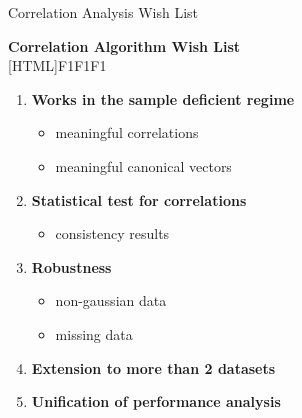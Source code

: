 \documentclass[8pt]{beamer}
\begin{document}
\begin{frame}{Correlation Analysis Wish List}
  \addtocounter{framenumber}{-1}

  \begin{center}
    \textbf{Correlation Algorithm Wish List}\\[1ex]
[HTML]{F1F1F1}{\parbox{0.8\textwidth}{%
    \begin{enumerate}
    \item \textcolor{texthigh}{\textbf{Works in the sample deficient regime} \checkmark}
      \begin{itemize}
      \item {\textcolor{texthigh}{meaningful correlations \checkmark}}
      \item \textcolor{texthigh}{meaningful canonical vectors \checkmark}
      \end{itemize}
    \item {\textcolor{texthigh}{\textbf{Statistical test for correlations} \checkmark}}
      \begin{itemize}
      \item {\textcolor{texthigh}{consistency results \checkmark}}
      \end{itemize}
    \item {\textcolor{texthigh}{\textbf{Robustness} \checkmark}}
      \begin{itemize}
      \item {\textcolor{texthigh}{non-gaussian data \checkmark}}
      \item {\textcolor{texthigh}{missing data \checkmark}}
      \end{itemize}
    \item \textcolor{texthigh}{\textbf{Extension to more than 2 datasets} \checkmark}
    \item \textbf{Unification of performance analysis}
    \end{enumerate}
}}
\end{center}

\end{frame}
\end{document}
